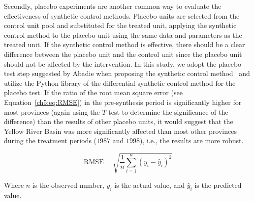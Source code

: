 Secondly, placebo experiments are another common way to evaluate the effectiveness of synthetic control methods.
Placebo units are selected from the control unit pool and substituted for the treated unit, applying the synthetic control method to the placebo unit using the same data and parameters as the treated unit.
If the synthetic control method is effective, there should be a clear difference between the placebo unit and the control unit since the placebo unit should not be affected by the intervention.
In this study, we adopt the placebo test step suggested by Abadie when proposing the synthetic control method~\cite{abadie2010} and utilize the Python library of the differential synthetic control method for the placebo test.
If the ratio of the root mean square error (see Equation~\ref{ch5:eq:RMSE}) in the pre-synthesis period is significantly higher for most provinces (again using the $T$ test to determine the significance of the difference) than the results of other placebo units, it would suggest that the Yellow River Basin was more significantly affected than most other provinces during the treatment periods ($1987$ and $1998$), i.e., the results are more robust.

\begin{equation}
    \label{ch5:eq:RMSE}
    \text{RMSE} = \sqrt{\frac{1}{n}\sum_{i=1}^{n}{(y_i-\hat{y}_i)}^2}
\end{equation}

Where $n$ is the observed number, $y_i$ is the actual value, and $\hat{y}_i$ is the predicted value.





